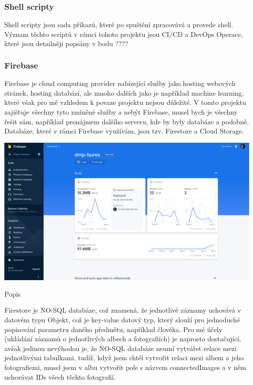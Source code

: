 \documentclass[12pt,a4paper]{report}
\begin{document}
  \subsubsection{Shell scripty}
  Shell scripty jsou sada příkazů, které po spuštění zpracovává a provede shell. Význam těchto
  scriptů v rámci tohoto projektu jsou CI/CD a DevOps Operace, které jsou detailněji popsány v bodu
  ????
  \subsubsection{Firebase}
  Firebase je cloud computing provider nabízející služby jako hosting webových stránek, hosting
  databází, ale mnoho dalších jako je například machine learning, které však pro mě vzhledem k
  povaze projektu nejsou důležité. V tomto projektu zajišťuje všechny tyto zmíněné služby a nebýt
  Firebase, musel bych je všechny řešit sám, například pronájmem dalšího serveru, kde by byly
  databáze a podobně.
  Databáze, které v rámci Firebase využívám, jsou tzv. Firestore a Cloud Storage.

  \vspace*{0.5cm}
  \noindent\includegraphics[width=\linewidth]{firebaseDash.png}
  \begin{center}
    Popis
  \end{center}
  \vspace*{0.5cm}
  Firestore je NO-SQL databáze, což znamená, že jednotlivé záznamy uchovává v datovém typu
  Objekt, což je key-value datový typ, který slouží pro jednoduché popisování parametru daného
  předmětu, například člověka. Pro mé účely (ukládání záznamů o jednotlivých albech a fotografiích)
  je naprosto dostačující, avšak jedinou nevýhodou je, že NO-SQL databáze neumí vytvářet relace
  mezi jednotlivými tabulkami, tudíž, když jsem chtěl vytvořit relaci mezi albem a jeho fotografiemi,
  musel jsem v albu vytvořit pole s názvem connectedImages a v něm uchovávat IDs všech těchto
  fotografií.
\end{document}
